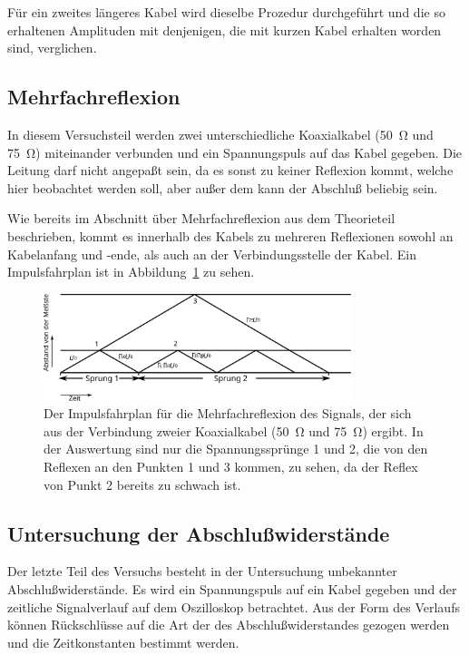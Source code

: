 Für ein zweites längeres Kabel wird dieselbe Prozedur durchgeführt und
die so erhaltenen Amplituden mit denjenigen, die mit kurzen Kabel
erhalten worden sind, verglichen.

\subsection{Mehrfachreflexion}
\label{sec:durchfuehrung-mehrfachreflexion}

In diesem Versuchsteil werden zwei unterschiedliche Koaxialkabel
(\SI{50}{\ohm} und \SI{75}{\ohm}) miteinander verbunden und ein
Spannungspuls auf das Kabel gegeben.  Die Leitung darf nicht angepaßt
sein, da es sonst zu keiner Reflexion kommt, welche hier beobachtet
werden soll, aber außer dem kann der Abschluß beliebig sein.

Wie bereits im Abschnitt über Mehrfachreflexion aus dem Theorieteil
beschrieben, kommt es innerhalb des Kabels zu mehreren Reflexionen
sowohl an Kabelanfang und -ende, als auch an der Verbindungsstelle der
Kabel.  Ein Impulsfahrplan ist in Abbildung~\ref{fig:impulsfahrplan} zu
sehen.

\begin{figure}
  \centering
  \includegraphics[width=0.8\textwidth]{impulsfahrplan}
  \caption{Der Impulsfahrplan für die Mehrfachreflexion des Signals, der
    sich aus der Verbindung zweier Koaxialkabel (\SI{50}{\ohm} und
    \SI{75}{\ohm}) ergibt.  In der Auswertung sind nur die
    Spannungssprünge 1 und 2, die von den Reflexen an den Punkten 1 und
    3 kommen, zu sehen, da der Reflex von Punkt 2 bereits zu schwach
    ist.}
  \label{fig:impulsfahrplan}
\end{figure}

\subsection{Untersuchung der Abschlußwiderstände}

Der letzte Teil des Versuchs besteht in der Untersuchung unbekannter
Abschlußwiderstände.  Es wird ein Spannungspuls auf ein Kabel gegeben
und der zeitliche Signalverlauf auf dem Oszilloskop betrachtet.  Aus der
Form des Verlaufs können Rückschlüsse auf die Art der des
Abschlußwiderstandes gezogen werden und die Zeitkonstanten bestimmt
werden.
